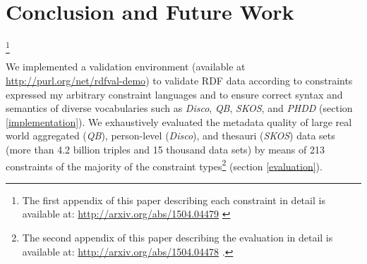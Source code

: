 \documentclass{llncs}
\begin{document}
{{\section{Conclusion and Future Work}


\footnote{The first appendix of this paper describing each constraint in detail is available at: \url{http://arxiv.org/abs/1504.04479} \cite{BoschZapilkoWackerowEckert2015}}

We implemented a validation environment (available at \url{http://purl.org/net/rdfval-demo}) to validate RDF data according to constraints expressed my arbitrary constraint languages and to ensure correct syntax and semantics of diverse vocabularies such as \emph{Disco}, \emph{QB}, \emph{SKOS}, and \emph{PHDD} (section \ref{implementation}).
We exhaustively evaluated the metadata quality of large real world aggregated (\emph{QB}), person-level (\emph{Disco}), and thesauri (\emph{SKOS}) data sets (more than 4.2 billion triples and 15 thousand data sets) by means of 213  constraints of the majority of the constraint types\footnote{The second appendix of this paper describing the evaluation in detail is available at: \url{http://arxiv.org/abs/1504.04478} \cite{BoschZapilkoWackerowEckert2015-2}.} (section \ref{evaluation}).

}}
\end{document}
